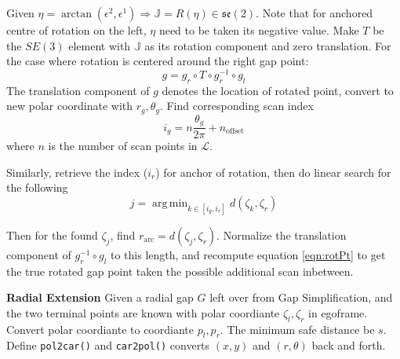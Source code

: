 \documentclass[11pt, letter]{article}
\DeclareMathOperator*{\argmin}{arg\,min}
\begin{document}
    Given $\eta = \arctan(\epsilon^2, \epsilon^1) \Rightarrow \mathbb{J} = R(\eta) \in \mathfrak{se}(2)$.
    Note that for anchored centre of rotation on the left, $\eta$ need to be taken
    its negative value.
    Make $T$ be the $SE(3)$ element with $\mathbb{J}$ as its rotation component
    and zero translation.
    For the case where rotation is centered around the right gap point:
    \begin{equation} \label{eqn:rotPt}
        g = g_r \circ T \circ g_r^{-1} \circ g_l
    \end{equation}
    The translation component of $g$ denotes the location of rotated point,
    convert to new polar coordinate with $r_g, \theta_g$. 
    Find corresponding scan index 
    \begin{equation*}
        i_g = n \frac{\theta_g}{2\pi} + n_{\text{offset}}
    \end{equation*}
    where $n$ is the number of scan points in $\mathcal{L}$.

    Similarly, retrieve the index ($i_r$) for anchor of rotation, then do
    linear search for the following
    \begin{equation*}
        j = \argmin_{k\in[i_g, i_r]} d(\zeta_k, \zeta_r)
    \end{equation*}

    Then for the found $\zeta_j$, find $r_{\text{arc}} = d(\zeta_j, \zeta_r)$.
    Normalize the translation component of $g_r^{-1} \circ g_l$ to this length,
    and recompute equation \ref{eqn:rotPt} to get the true rotated gap point
    taken the possible additional scan inbetween.

    \pagebreak
    \textbf{Radial Extension}
    Given a radial gap $G$ left over from Gap Simplification, and the two terminal 
    points are known with polar coordiante $\zeta_l, \zeta_r$ in egoframe.
    Convert polar coordiante to coordiante $p_l, p_r$. The minimum safe distance
    be $s$. Define \texttt{pol2car()} and \texttt{car2pol()} converts $(x,y)$
    and $(r, \theta)$ back and forth. 
\end{document}

